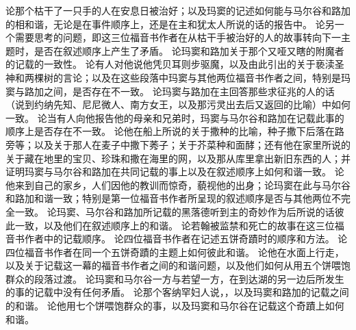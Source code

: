 论那个枯干了一只手的人在安息日被治好；以及玛窦的记述如何能与马尔谷和路加的相和谐，无论是在事件顺序上，还是在主和犹太人所说的话的报告中。\newline{} 论另一个需要思考的问题，即这三位福音书作者在从枯干手被治好的人的故事转向下一主题时，是否在叙述顺序上产生了矛盾。\newline{} 论玛窦和路加关于那个又哑又瞎的附魔者的记载的一致性。\newline{} 论有人对他说他凭贝耳则步驱魔，以及由此引出的关于亵渎圣神和两棵树的言论；以及在这些段落中玛窦与其他两位福音书作者之间，特别是玛窦与路加之间，是否存在不一致。\newline{} 论玛窦与路加在主回答那些求征兆的人的话（说到约纳先知、尼尼微人、南方女王，以及那污灵出去后又返回的比喻）中如何一致。\newline{} 论当有人向他报告他的母亲和兄弟时，玛窦与马尔谷和路加在记载此事的顺序上是否存在不一致。\newline{} 论他在船上所说的关于撒种的比喻，种子撒下后落在路旁等；以及关于那人在麦子中撒下莠子；关于芥菜种和面酵；还有他在家里所说的关于藏在地里的宝贝、珍珠和撒在海里的网，以及那从库里拿出新旧东西的人；并证明玛窦与马尔谷和路加在共同记载的事上以及在叙述顺序上如何和谐一致。\newline{} 论他来到自己的家乡，人们因他的教训而惊奇，藐视他的出身；论玛窦在此与马尔谷和路加和谐一致；特别是第一位福音书作者所呈现的叙述顺序是否与其他两位不完全一致。\newline{} 论玛窦、马尔谷和路加所记载的黑落德听到主的奇妙作为后所说的话彼此一致，以及他们在叙述顺序上的和谐。\newline{} 论若翰被监禁和死亡的故事在这三位福音书作者中的记载顺序。\newline{} 论四位福音书作者在记述五饼奇蹟时的顺序和方法。\newline{} 论四位福音书作者在同一个五饼奇蹟的主题上如何彼此和谐。\newline{} 论他在水面上行走，以及关于记载这一幕的福音书作者之间的和谐问题，以及他们如何从用五个饼喂饱群众的段落过渡。\newline{} 论玛窦和马尔谷一方与若望一方，在到达湖的另一边后所发生的事的记载中没有任何矛盾。\newline{} 论那个客纳罕妇人说，，以及玛窦和路加的记载之间的和谐。\newline{} 论他用七个饼喂饱群众的事，以及玛窦和马尔谷在记载这个奇蹟上如何和谐。\newline{} 